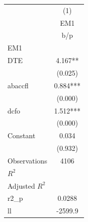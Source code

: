 {
\def\sym#1{\ifmmode^{#1}\else\(^{#1}\)\fi}
\begin{tabular}{l*{1}{c}}
\hline\hline
                    &\multicolumn{1}{c}{(1)}\\
                    &\multicolumn{1}{c}{EM1}\\
                    &         b/p   \\
\hline
EM1                 &               \\
DTE                 &       4.167** \\
                    &     (0.025)   \\
abaccfl             &       0.884***\\
                    &     (0.000)   \\
dcfo                &       1.512***\\
                    &     (0.000)   \\
Constant            &       0.034   \\
                    &     (0.932)   \\
\hline
Observations        &        4106   \\
\(R^{2}\)           &               \\
Adjusted \(R^{2}\)  &               \\
r2\_p                &      0.0288   \\
ll                  &     -2599.9   \\
\hline\hline
\end{tabular}
}
